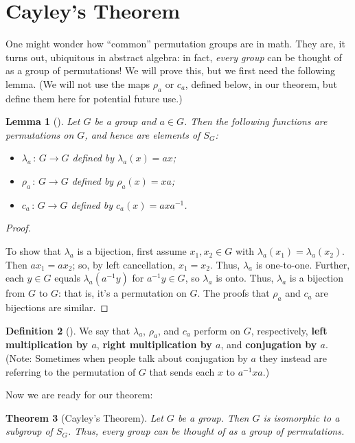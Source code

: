 \documentclass[10pt,openany,oneside]{book}
\newcommand{\terminology}[1]{\textbf{#1}}
\theoremstyle{plain}
\newtheorem{theorem}{Theorem}[section]
\newtheorem{lemma}[theorem]{Lemma}
\theoremstyle{definition}
\newtheorem{definition}[theorem]{Definition}
\theoremstyle{definition}
\theoremstyle{definition}
\theoremstyle{definition}
\numberwithin{equation}{section}
\begin{document}
\section[{Cayley's Theorem}]{Cayley's Theorem}\label{section-20}
One might wonder how ``common'' permutation groups are in math. They are, it turns out, ubiquitous in abstract algebra: in fact, \emph{every group} can be thought of as a group of permutations! We will prove this, but we first need the following lemma. (We will not use the maps \(\rho_a\) or \(c_a\), defined below, in our theorem, but define them here for potential future use.)%
\begin{lemma}[{}]\label{cay_lem}
Let \(G\) be a group and \(a\in G\). Then the following functions are permutations on \(G\), and hence are elements of \(S_G\): \leavevmode%
\begin{itemize}[label=\textbullet]
\item{}\(\lambda_a\,:\,G\to G\) defined by \(\lambda_a(x)=ax\);%
\item{}\(\rho_a\,:\,G\to G\) defined by \(\rho_a(x)=xa\);%
\item{}\(c_a\,:\,G\to G\) defined by \(c_a(x)=axa^{-1}\).%
\end{itemize}
%
\end{lemma}
\begin{proof}\hypertarget{proof-27}{}
To show that \(\lambda_a\) is a bijection, first assume \(x_1,x_2 \in G\) with \(\lambda_a(x_1)=\lambda_a(x_2)\). Then \(ax_1=ax_2\); so, by left cancellation, \(x_1=x_2\). Thus, \(\lambda_a\) is one-to-one. Further, each \(y\in G\) equals \(\lambda_a(a^{-1}y)\) for \(a^{-1}y\in G\), so \(\lambda_a\) is onto. Thus, \(\lambda_a\) is a bijection from \(G\) to \(G\): that is, it's a permutation on \(G\). The proofs that \(\rho_a\) and \(c_a\) are bijections are similar.%
\end{proof}
\begin{definition}[{}]\label{definition-51}
\label{notation-59}
\label{notation-60}
We say that \(\lambda_a\), \(\rho_a\), and \(c_a\) perform on \(G\), respectively, \terminology{left multiplication by \(a\)}, \terminology{right multiplication by \(a\)}, and \terminology{conjugation by \(a\)}. (Note: Sometimes when people talk about conjugation by \(a\) they instead are referring to the permutation of \(G\) that sends each \(x\) to \(a^{-1}xa\).)%
\end{definition}
Now we are ready for our theorem:%
\begin{theorem}[{Cayley's Theorem}]\label{theorem-39}
Let \(G\) be a group. Then \(G\) is isomorphic to a subgroup of \(S_G\). Thus, every group can be thought of as a group of permutations.%
\end{theorem}
\end{document}
